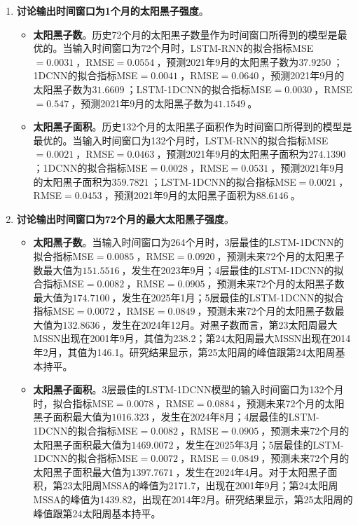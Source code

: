 \begin{enumerate}
    \begin{enumerate}
      \item \textbf{讨论输出时间窗口为1个月的太阳黑子强度}。
      \begin{itemize}
        \item \textbf{太阳黑子数}。历史72个月的太阳黑子数量作为时间窗口所得到的模型是最优的。当输入时间窗口为72个月时，LSTM-RNN的拟合指标MSE$=\SI{0.0031}{}$，RMSE$=\SI{0.0554}{}$，预测2021年9月的太阳黑子数为$\SI{37.9250}{}$；1DCNN的拟合指标MSE$=\SI{0.0041}{}$，RMSE$=\SI{0.0640}{}$，预测2021年9月的太阳黑子数为$\SI{31.6609}{}$；LSTM-1DCNN的拟合指标MSE$=\SI{0.0030}{}$，RMSE$=\SI{0.547}{}$，预测2021年9月的太阳黑子数为$\SI{41.1549}{}$。
        \item \textbf{太阳黑子面积}。历史132个月的太阳黑子面积作为时间窗口所得到的模型是最优的。当输入时间窗口为132个月时，LSTM-RNN的拟合指标MSE$=\SI{0.0021}{}$，RMSE$=\SI{0.0463}{}$，预测2021年9月的太阳黑子面积为$\SI{274.1390}{}$；1DCNN的拟合指标MSE$=\SI{0.0028}{}$，RMSE$=\SI{0.0531}{}$，预测2021年9月的太阳黑子面积为$\SI{359.7821}{}$；LSTM-1DCNN的拟合指标MSE$=\SI{0.0021}{}$，RMSE$=\SI{0.0453}{}$，预测2021年9月的太阳黑子面积为$\SI{88.6146}{}$。
      \end{itemize}
      \item \textbf{讨论输出时间窗口为72个月的最大太阳黑子强度}。
      \begin{itemize}
        \item \textbf{太阳黑子数}。当输入时间窗口为264个月时，3层最佳的LSTM-1DCNN的拟合指标MSE$=\SI{0.0085}{}$，RMSE$=\SI{0.0920}{}$，预测未来72个月的太阳黑子数最大值为$\SI{151.5516}{}$，发生在2023年9月；4层最佳的LSTM-1DCNN的拟合指标MSE$=\SI{0.0082}{}$，RMSE$=\SI{0.0905}{}$，预测未来72个月的太阳黑子数最大值为$\SI{174.7100}{}$，发生在2025年1月；5层最佳的LSTM-1DCNN的拟合指标MSE$=\SI{0.0072}{}$，RMSE$=\SI{0.0849}{}$，预测未来72个月的太阳黑子数最大值为$\SI{132.8636}{}$，发生在2024年12月。对黑子数而言，第23太阳周最大MSSN出现在2001年9月，其值为238.2；第24太阳周最大MSSN出现在2014年2月，其值为146.1。研究结果显示，第25太阳周的峰值跟第24太阳周基本持平。 
        \item \textbf{太阳黑子面积}。3层最佳的LSTM-1DCNN模型的输入时间窗口为132个月时，拟合指标MSE$=\SI{0.0078}{}$，RMSE$=\SI{0.0884}{}$，预测未来72个月的太阳黑子面积最大值为$\SI{1016.323}{}$，发生在2024年8月；4层最佳的LSTM-1DCNN的拟合指标MSE$=\SI{0.0082}{}$，RMSE$=\SI{0.0905}{}$，预测未来72个月的太阳黑子面积最大值为$\SI{1469.0072}{}$，发生在2025年3月；5层最佳的LSTM-1DCNN的拟合指标MSE$=\SI{0.0072}{}$，RMSE$=\SI{0.0849}{}$，预测未来72个月的太阳黑子面积最大值为$\SI{1397.7671}{}$，发生在2024年4月。对于太阳黑子面积，第23太阳周MSSA的峰值为2171.7，出现在2001年9月；第24太阳周MSSA的峰值为1439.82，出现在2014年2月。研究结果显示，第25太阳周的峰值跟第24太阳周基本持平。 
      \end{itemize}
    \end{enumerate}
    

\end{enumerate}
